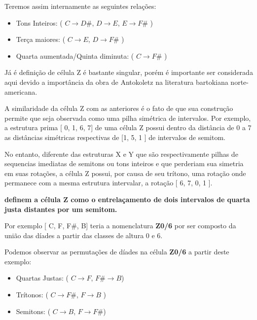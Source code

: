 \documentclass[
	12pt,				%
	openright,			%
	twoside,			%
	a4paper,			%
	english,			%
	french,				%
	spanish,			%
	brazil				%
	]{abntex2}
\begin{document}
Teremos assim internamente as seguintes relações:

\begin{itemize}
\item Tons Inteiros: ( $C \rightarrow D\#$, $D \rightarrow E$, $E \rightarrow F\#$ ) 

\item Terça maiores: ( $C \rightarrow E$, $D \rightarrow F\#$ )

\item Quarta aumentada/Quinta diminuta: ( $C \rightarrow F\#$ )
\end{itemize}


Já é definição de célula Z é bastante singular, porém é importante ser considerada aqui devido a importância da obra de Antokoletz na literatura bartokiana norte-americana. 

A similaridade da célula Z com as anteriores é o fato de que sua construção permite que seja observada como uma pilha simétrica de intervalos. Por exemplo, a estrutura prima [ 0, 1, 6, 7] de uma célula Z possui dentro da distância de 0 a 7 as distâncias simétricas respectivas de [1, 5, 1 ] de intervalos de semitom. 

No entanto, diferente das estruturas X e Y que são respectivamente pilhas de sequencias imediatas de semitons ou tons inteiros e que perderiam sua simetria em suas rotações, a célula Z possui, por causa de seu trítono, uma rotação onde permanece com a mesma estrutura intervalar, a rotação [ 6, 7, 0, 1 ]. 

 \textbf{definem a célula Z como o entrelaçamento de dois intervalos de quarta justa distantes por um semitom.} 

Por exemplo [ C, F, F\#, B] teria a nomenclatura \textbf{Z0/6} por ser composto da união das díades a partir das classes de altura 0 e 6. 

Podemos observar as permutações de díades na célula \textbf{Z0/6} a partir deste exemplo:

\begin{itemize}
\item Quartas Justas: ( $C \rightarrow F$, $F\# \rightarrow B$) 

\item Trítonos: ( $C \rightarrow F\#$, $F \rightarrow B$ )

\item Semitons: ( $C \rightarrow B$, $F \rightarrow F\#$)
\end{itemize}
\end{document}
